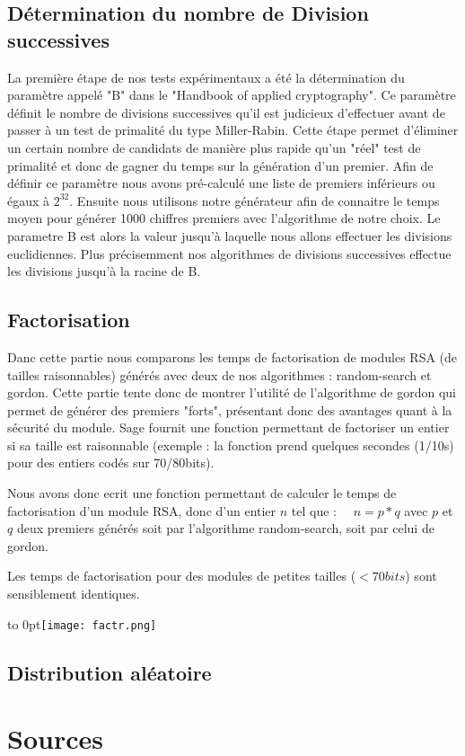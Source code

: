 \documentclass[a4paper,11pt]{article}
\begin{document}
\subsection{Détermination du nombre de Division successives}
La première étape de nos tests expérimentaux a été la détermination du paramètre appelé "B" dans le "Handbook of applied cryptography". Ce paramètre définit le nombre de divisions successives qu'il est judicieux d'effectuer avant de passer à un test de primalité du type Miller-Rabin. Cette étape permet d'éliminer un certain nombre de candidats de manière plus rapide qu'un "réel" test de primalité et donc de gagner du temps sur la génération d'un premier. 
\newline
Afin de définir ce paramètre nous avons pré-calculé une liste de premiers inférieurs ou égaux à $2^{32}$. Ensuite nous utilisons notre générateur afin de connaitre le temps moyen pour générer 1000 chiffres premiers avec l'algorithme de notre choix. Le parametre B est alors la valeur jusqu'à laquelle nous allons effectuer les divisions euclidiennes.
Plus précisemment nos algorithmes de divisions successives effectue les divisions jusqu'à la racine de B. 


\subsection{Factorisation }
Danc cette partie nous comparons les temps de factorisation de modules RSA (de tailles raisonnables) générés avec deux de nos algorithmes : random-search et gordon. Cette partie tente donc de montrer l'utilité de l'algorithme de gordon qui permet de générer des premiers "forts", présentant donc des avantages quant à la sécurité du module.
Sage fournit une fonction permettant de factoriser un entier si sa taille est raisonnable (exemple : la fonction prend quelques secondes (1/10s) pour des entiers codés sur 70/80bits). 
\par Nous avons donc ecrit une fonction permettant de calculer le temps de factorisation d'un module RSA, donc d'un entier $n$ tel que : \
\ $n = p * q$ 
\newline avec $p$ et $q$ deux premiers générés soit par l'algorithme random-search, soit par celui de gordon.

Les temps de factorisation pour des modules de petites tailles ($ < 70 bits$) sont sensiblement identiques.

\hfill\hbox to 0pt{\hss\texttt{[image: factr.png]}\hss}\hfill\null




\subsection{Distribution aléatoire}
\section*{Sources}




 
  
\end{document}
